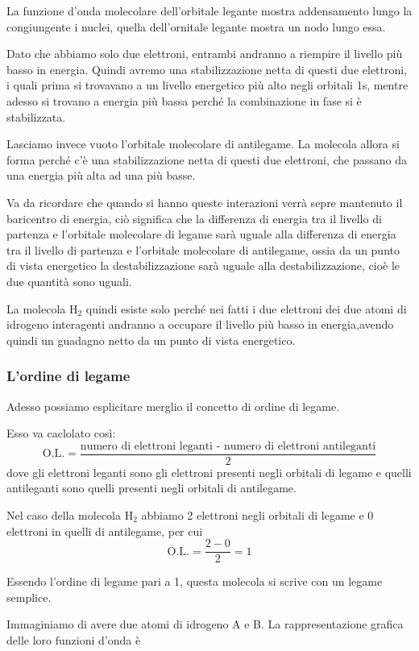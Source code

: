 La funzione d'onda molecolare dell'orbitale legante mostra addensamento lungo la congiungente i nuclei, quella dell'ornitale legante mostra un nodo lungo essa.

\vspace{0.2cm}Dato che abbiamo solo due elettroni, entrambi andranno a riempire il livello più basso in energia. Quindi avremo una stabilizzazione netta di questi due elettroni, i quali prima si trovavano a un livello energetico più alto negli orbitali 1s, mentre adesso si trovano a energia più bassa perché la combinazione in fase si è stabilizzata.

Lasciamo invece vuoto l'orbitale molecolare di antilegame.
La molecola allora si forma perché c'è una stabilizzazione netta di questi due elettroni, che passano da una energia più alta ad una più basse.

Va da ricordare che quando si hanno queste interazioni verrà sepre mantenuto il baricentro di energia, ciò significa che la differenza di energia tra il livello di partenza e l'orbitale molecolare di legame sarà uguale alla differenza di energia tra il livello di partenza e l'orbitale molecolare di antilegame, ossia da un punto di vista energetico la destabilizzazione sarà uguale alla destabilizzazione, cioè le due quantità sono uguali.

La molecola H$_2$ quindi esiste solo perché nei fatti i due elettroni dei due atomi di idrogeno interagenti andranno a occupare il livello più basso in energia,avendo quindi un guadagno netto da un punto di vista energetico.

\subsubsection{L'ordine di legame}
Adesso possiamo esplicitare merglio il concetto di ordine di legame.

Esso va caclolato così:
$$\text{O.L.}=\frac{\text{numero di elettroni leganti - numero di elettroni antileganti}}{2}$$
dove gli elettroni leganti sono gli elettroni presenti negli orbitali di legame e quelli antileganti sono quelli presenti negli orbitali di antilegame.

Nel caso della molecola H$_2$ abbiamo 2 elettroni negli orbitali di legame e 0 elettroni in quelli di antilegame, per cui
$$\text{O.L.}=\frac{2-0}{2}=1$$

Essendo l'ordine di legame pari a 1, questa molecola si scrive con un legame semplice.

\vspace{0.2cm}Immaginiamo di avere due atomi di idrogeno A e B. La rappresentazione grafica delle loro funzioni d'onda è

